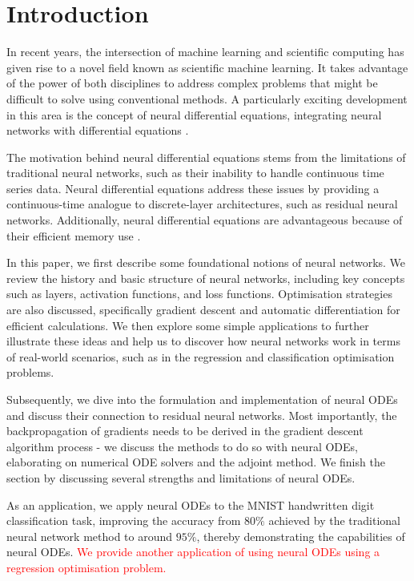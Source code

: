 \documentclass[a4paper,11pt,titlepage]{article}
\theoremstyle{definition}
\theoremstyle{plain}
\theoremstyle{remark}
\begin{document}
\section{Introduction}

In recent years, the intersection of machine learning and scientific computing has given rise to a novel field known as scientific machine learning. It takes advantage of the power of both disciplines to address complex problems that might be difficult to solve using conventional methods. A particularly exciting development in this area is the concept of neural differential equations, integrating neural networks with differential equations \cite{chen2018neural}.

The motivation behind neural differential equations stems from the limitations of traditional neural networks, such as their inability to handle continuous time series data. Neural differential equations address these issues by providing a continuous-time analogue to discrete-layer architectures, such as residual neural networks. Additionally, neural differential equations are advantageous because of their efficient memory use \cite{haoxuan2023}.

In this paper, we first describe some foundational notions of neural networks. We review the history and basic structure of neural networks, including key concepts such as layers, activation functions, and loss functions. Optimisation strategies are also discussed, specifically gradient descent and automatic differentiation for efficient calculations. We then explore some simple applications to further illustrate these ideas and help us to discover how neural networks work in terms of real-world scenarios, such as in the regression and classification optimisation problems.

Subsequently, we dive into the formulation and implementation of neural ODEs and discuss their connection to residual neural networks. Most importantly, the backpropagation of gradients needs to be derived in the gradient descent algorithm process - we discuss the methods to do so with neural ODEs, elaborating on numerical ODE solvers and the adjoint method. We finish the section by discussing several strengths and limitations of neural ODEs.

As an application, we apply neural ODEs to the MNIST handwritten digit classification task, improving the accuracy from $80\%$ achieved by the traditional neural network method to around $95\%$, thereby demonstrating the capabilities of neural ODEs. \textcolor{red}{We provide another application of using neural ODEs using a regression optimisation problem.}
\end{document}

